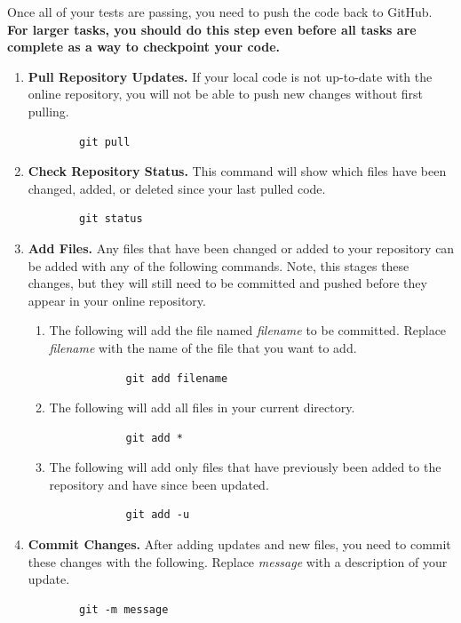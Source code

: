 \documentclass{article} %
\begin{document}

Once all of your tests are passing, you need to push the code back to GitHub.  \textbf{For larger tasks, you should do this step even before all tasks are complete as a way to checkpoint your code.}

\begin{enumerate}
    \item \textbf{Pull Repository Updates.} If your local code is not up-to-date with the online repository, you will not be able to push new changes without first pulling.
    \begin{verbatim}
        git pull
    \end{verbatim}

    \item \textbf{Check Repository Status.} This command will show which files have been changed, added, or deleted since your last pulled code.
    \begin{verbatim}
        git status
    \end{verbatim}
    
    \item \textbf{Add Files.}  Any files that have been changed or added to your repository can be added with any of the following commands.  Note, this stages these changes, but they will still need to be committed and pushed before they appear in your online repository.
    \begin{enumerate}
        \item The following will add the file named \emph{filename} to be committed.  Replace \emph{filename} with the name of the file that you want to add.  
        \begin{verbatim}
            git add filename
        \end{verbatim}
        \item The following will add all files in your current directory.
        \begin{verbatim}
            git add *
        \end{verbatim}
        \item The following will add only files that have previously been added to the repository and have since been updated.
        \begin{verbatim}
            git add -u
        \end{verbatim}
    \end{enumerate}

    \item \textbf{Commit Changes.}  After adding updates and new files, you need to commit these changes with the following. Replace \emph{message} with a description of your update.
    \begin{verbatim}
        git -m message
    \end{verbatim}


\end{enumerate}
\end{document}
